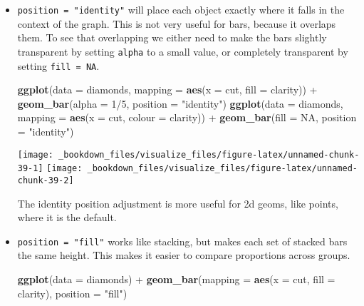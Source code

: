 \documentclass[]{book}
\newenvironment{Shaded}{\begin{snugshade}}{\end{snugshade}}
\newcommand{\KeywordTok}[1]{\textcolor[rgb]{0.13,0.29,0.53}{\textbf{{#1}}}}
\newcommand{\DataTypeTok}[1]{\textcolor[rgb]{0.13,0.29,0.53}{{#1}}}
\newcommand{\DecValTok}[1]{\textcolor[rgb]{0.00,0.00,0.81}{{#1}}}
\newcommand{\StringTok}[1]{\textcolor[rgb]{0.31,0.60,0.02}{{#1}}}
\newcommand{\OtherTok}[1]{\textcolor[rgb]{0.56,0.35,0.01}{{#1}}}
\newcommand{\NormalTok}[1]{{#1}}
\begin{document}
\begin{itemize}
\item
  \texttt{position\ =\ "identity"} will place each object exactly where
  it falls in the context of the graph. This is not very useful for
  bars, because it overlaps them. To see that overlapping we either need
  to make the bars slightly transparent by setting \texttt{alpha} to a
  small value, or completely transparent by setting
  \texttt{fill\ =\ NA}.

\begin{Shaded}
\begin{Highlighting}[]
\KeywordTok{ggplot}\NormalTok{(}\DataTypeTok{data =} \NormalTok{diamonds, }\DataTypeTok{mapping =} \KeywordTok{aes}\NormalTok{(}\DataTypeTok{x =} \NormalTok{cut, }\DataTypeTok{fill =} \NormalTok{clarity)) +}\StringTok{ }
\StringTok{  }\KeywordTok{geom_bar}\NormalTok{(}\DataTypeTok{alpha =} \DecValTok{1}\NormalTok{/}\DecValTok{5}\NormalTok{, }\DataTypeTok{position =} \StringTok{"identity"}\NormalTok{)}
\KeywordTok{ggplot}\NormalTok{(}\DataTypeTok{data =} \NormalTok{diamonds, }\DataTypeTok{mapping =} \KeywordTok{aes}\NormalTok{(}\DataTypeTok{x =} \NormalTok{cut, }\DataTypeTok{colour =} \NormalTok{clarity)) +}\StringTok{ }
\StringTok{  }\KeywordTok{geom_bar}\NormalTok{(}\DataTypeTok{fill =} \OtherTok{NA}\NormalTok{, }\DataTypeTok{position =} \StringTok{"identity"}\NormalTok{)}
\end{Highlighting}
\end{Shaded}

  \texttt{[image: \_bookdown\_files/visualize\_files/figure-latex/unnamed-chunk-39-1]}
  \texttt{[image: \_bookdown\_files/visualize\_files/figure-latex/unnamed-chunk-39-2]}

  The identity position adjustment is more useful for 2d geoms, like
  points, where it is the default.
\item
  \texttt{position\ =\ "fill"} works like stacking, but makes each set
  of stacked bars the same height. This makes it easier to compare
  proportions across groups.

\begin{Shaded}
\begin{Highlighting}[]
\KeywordTok{ggplot}\NormalTok{(}\DataTypeTok{data =} \NormalTok{diamonds) +}\StringTok{ }
\StringTok{  }\KeywordTok{geom_bar}\NormalTok{(}\DataTypeTok{mapping =} \KeywordTok{aes}\NormalTok{(}\DataTypeTok{x =} \NormalTok{cut, }\DataTypeTok{fill =} \NormalTok{clarity), }\DataTypeTok{position =} \StringTok{"fill"}\NormalTok{)}
\end{Highlighting}
\end{Shaded}


\end{itemize}
\end{document}
